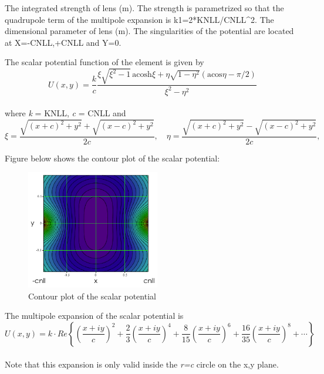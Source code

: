 \begin{madlist}
    The integrated strength of lens (m). The strength is
     parametrized so that the quadrupole term of the multipole
     expansion is k1=2*KNLL/CNLL\textasciicircum2.      
    The dimensional parameter of lens (m). The singularities
     of the potential are located at X=-CNLL,+CNLL and Y=0.  
\end{madlist}

The scalar potential function of the element is given by
\begin{equation}
U(x,y)=\frac{k}{c}\frac{\xi\sqrt{\xi^2-1} \, \text{acosh}\xi +  
  \eta\sqrt{1-\eta^2}(\text{acos}\eta-\pi/2)}{\xi^2-\eta^2}
\end{equation}
\\ where \textit{k} = KNLL, \textit{c} = CNLL and 
\begin{equation}
\xi = \frac{\sqrt{(x+c)^2+y^2}+\sqrt{(x-c)^2+y^2}}{2c}, 
\quad \eta = \frac{\sqrt{(x+c)^2+y^2}-\sqrt{(x-c)^2+y^2}}{2c},
\end{equation}

Figure below shows the contour plot of the scalar potential: \\
\begin{figure}
  \begin{center}    
    \includegraphics[width=220px]{jpg/nllens_potential-2D.jpg}
    \caption{Contour plot of the scalar potential}
    \label{fig:nllens_potential}
  \end{center}
\end{figure}

The multipole expansion of the scalar potential is \\
\begin{equation}
U(x,y)=k\cdot Re\left\{ \left(\dfrac{x + i y}{c}\right)^2 + 
\frac{2}{3}\left(\dfrac{x + i y}{c}\right)^4 +
\frac{8}{15}\left(\dfrac{x + i y}{c}\right)^6 + 
\frac{16}{35}\left(\dfrac{x + i y}{c}\right)^8 + \cdots \right\}
\end{equation}
\\ 
Note that this expansion is only valid inside the \textit{r=c} circle on
the x,y plane.    

